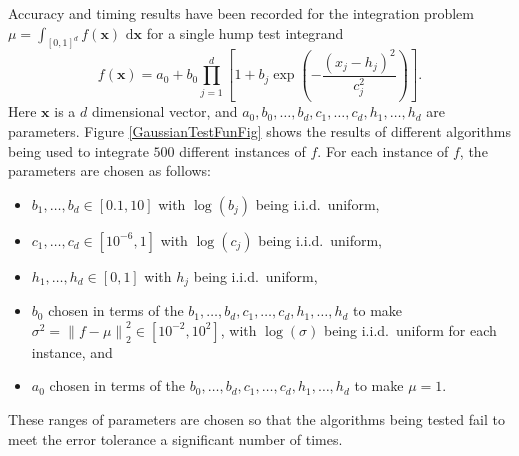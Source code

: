 \documentclass[graybox]{svmult}
\newcommand{\vx}{\boldsymbol{x}}
\newcommand{\rd}{\,\mathrm{d}}
\newcommand{\dif}{\rd}
\newcommand{\norm}[2][{}]{\ensuremath{\left \lVert #2 \right \rVert}_{#1}}
\begin{document}
Accuracy and timing results have been recorded for the integration problem $\mu=\int_{[0,1]^d} f(\vx) \, \dif \vx$ for a single hump test integrand
\begin{equation} \label{GaussianTestFun}
f(\vx)=a_0 + b_0\prod_{j=1}^d\left[ 1 +b_j \exp \left(-\frac{(x_j-h_j)^2}{c_j^2}\right) \right].
\end{equation}
Here $\vx$ is a $d$ dimensional vector, and $a_0, b_0, \ldots, b_d, c_1, \ldots, c_d, h_1, \ldots, h_d$ are parameters. Figure \ref{GaussianTestFunFig} shows the results of different algorithms being used to integrate $500$ different instances of $f$.  For each instance of $f$, the parameters are chosen as follows:
\begin{itemize} 
\item $b_1, \ldots, b_d \in [0.1,10]$ with $\log(b_j)$ being i.i.d.\ uniform,
\item $c_1, \ldots, c_d \in [10^{-6},1]$ with $\log(c_j)$ being i.i.d.\ uniform,
\item $h_1, \ldots, h_d \in [0,1]$ with $h_j$ being i.i.d.\ uniform,
\item $b_0$ chosen in terms of the $b_1, \ldots, b_d, c_1, \ldots, c_d, h_1, \ldots, h_d$ to make $\sigma^2 =\norm[2]{f-\mu}^2 \in [10^{-2}, 10^2]$, with $\log(\sigma)$ being i.i.d.\ uniform for each instance, and
\item $a_0$ chosen in terms of the $b_0, \ldots, b_d, c_1, \ldots, c_d, h_1, \ldots, h_d$ to make $\mu=1$.
\end{itemize}
These ranges of parameters are chosen so that the algorithms being tested fail to meet the error tolerance a significant number of times.
\end{document}
